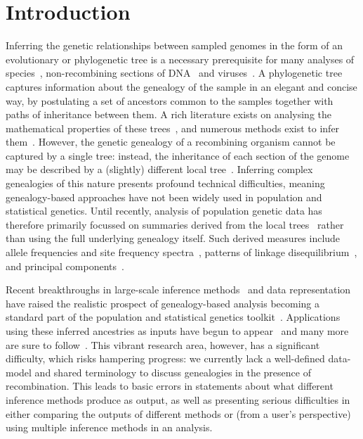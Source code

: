 \documentclass{article}
\begin{document}
\section*{Introduction}
Inferring the genetic relationships between sampled genomes in the form of an
evolutionary or phylogenetic tree is a necessary prerequisite for many analyses of
species~\citep{rannala2003genetics}, non-recombining sections of
DNA~\citep{cann1987mitochondrial,underhill2001annalsofhumangenetics}
and viruses~\citep{grenfell2004science}.
A phylogenetic tree captures information about the genealogy
of the sample in an elegant and concise
way, by postulating a set of ancestors common to the samples
together with paths of inheritance between them. A rich literature exists
on analysing the mathematical properties of these
trees~\citep{steel2016phylogeny}, and numerous
methods exist to infer them~\citep{felsenstein2004inferring}.
However, the genetic genealogy of a recombining organism
cannot be captured by a single tree: instead,
the inheritance of each section of the genome may be described
by a (slightly) different local tree~\citep{hudson1983properties}. Inferring complex
genealogies of this nature
presents profound technical difficulties, meaning genealogy-based approaches have
not been widely used in population and statistical genetics. Until recently, analysis of
population genetic data has therefore primarily focussed on summaries derived
from the local trees~\citep{tajima1983evolutionary,tavare1984line}
rather than using the full underlying genealogy itself. Such
derived measures include allele frequencies and site frequency
spectra~\citep{achaz2009frequency,ralph2020efficiently},
patterns of linkage disequilibrium~\citep{mcvean2002genealogical}, and
principal components~\citep{mcvean2009genealogical}.

Recent breakthroughs in large-scale inference
methods~\citep{rasmussen2014genome,kelleher2019inferring,speidel2019method,wohns2022unified}
and data representation~\citep{kelleher2016efficient}
have raised the realistic prospect of genealogy-based analysis becoming a standard part
of the population and statistical genetics toolkit~\citep{hejase2020summary}.
Applications using these inferred ancestries as inputs have begun to
appear~\citep{osmond2021estimating,zhang2021biobank,fan2022genealogical,hejase2022deep}
and many more are sure to
follow~\citep{harris2019database}. This vibrant research area, however,
has a significant difficulty, which risks hampering
progress: we currently lack a well-defined data-model and shared terminology
to discuss genealogies in the presence of recombination. This leads to basic errors in statements
about what different inference methods produce as output, as well as presenting serious
difficulties in either comparing the outputs of different methods or
(from a user's perspective) using multiple inference methods in an analysis.
\end{document}
